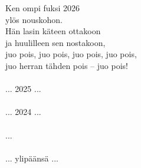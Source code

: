 Ken ompi fuksi 2026 \\ ylös nouskohon. \\ Hän lasin käteen ottakoon \\ ja huulilleen sen nostakoon, \\ juo pois, juo pois, juo pois, juo pois, \\ juo herran tähden pois -- juo pois! \\
\hspace{10mm} \\ ... 2025 ... \\
\hspace{10mm} \\ ... 2024 ... \\
\hspace{10mm} \\ ... \\
\hspace{10mm} \\ ... ylipäänsä ... 
